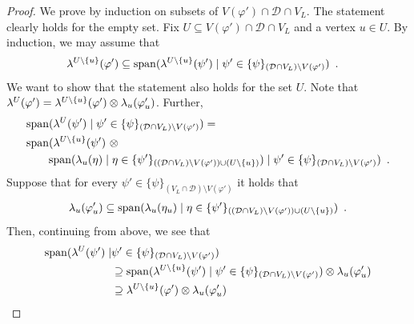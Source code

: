 \documentclass{article}
\newcommand{\set}[1]{\{ #1 \}}
\newcommand{\eqperiod}{\enspace .}
\newcommand{\V}[1][]{V_{#1}}
\newcommand{\Vl}{\V[L]}
\newcommand{\linmap}[1][]{\ensuremath \lambda_{{#1}}}
\newcommand{\linmapof}[2][]{\linmap[#1](#2)}
\newcommand{\linmapl}[2][]{\ensuremath \lambda^{{#2}}_{{#1}}}
\newcommand{\linmaplof}[3][]{\linmapl[#1]{#2}(#3)}
\newcommand{\diffclosure}[1][]{D_{{#1}}}
\renewcommand{\diffclosure}[1][]{\mathcal{D}_{{#1}}}
\newcommand{\matchb}{\varphi'}
\newcommand{\matchc}{\psi}
\newcommand{\matchd}{\psi'}
\newcommand{\matche}{\eta}
\newcommand{\spans}[1]{\mathrm{span} ( #1 )}
\newcommand{\tensor}{\ensuremath \otimes}
\numberwithin{equation}{section}
\begin{document}
\begin{proof}
  We prove  by induction on subsets of
  $V(\matchb) \cap \diffclosure \cap \Vl$. The statement clearly holds
  for the empty set. 
  Fix $U \subseteq V(\matchb) \cap \diffclosure \cap \Vl$ and a vertex
  $u \in U$. By induction, we may assume that
  \begin{align}\label{eq:ih}
    \linmaplof{U \setminus \set{u}}{\matchb}
    &\subseteq
      \spans{
      \linmaplof{U
      \setminus \set{u}}
      {\matchd} \mid \matchd \in 
      \set{\matchc}_{(\diffclosure \cap \Vl) \setminus V(\matchb)}} 
      \eqperiod
  \end{align}
  We want to show that the statement also holds for the set $U$.
  Note that 
    $\linmaplof{U}{\matchb} 
    = 
    \linmaplof{U \setminus \set{u}}{\matchb} \tensor 
    \linmapof[u]{\matchb_u}$. Further,
  \begin{align}
    &\spans{\linmaplof{U}{\matchd}
      \mid \matchd \in \set{\matchc}_{(\diffclosure \cap \Vl)
      \setminus V(\matchb)}
      } =\\
    &\spans{\linmaplof{U \setminus \set{u}}{\matchd} ~\tensor
      \nonumber\\
    &\qquad
    \spans{\linmapof[u]{\matche} \mid \matche \in
      \set{\matchd}_{((\diffclosure \cap \Vl) \setminus
    V(\matchb)) \cup (U \setminus \set{u})}}
      \mid \matchd \in \set{\matchc}_{(\diffclosure \cap \Vl)
      \setminus V(\matchb)}
      } \eqperiod
  \end{align}
  Suppose that for every $\matchd \in \set{\matchc}_{(\Vl \cap \diffclosure)
      \setminus V(\matchb)}$ it holds that
  \begin{align}\label{eq:linspace_u_spanned}
    \linmapof[u]{\matchb_u} \subseteq \spans{\linmapof[u]{\matche_u} 
    \mid \matche \in \set{\matchd}
    _{((\diffclosure \cap \Vl) \setminus V(\matchb))\cup (U \setminus
    \set{u})}}
    \eqperiod
  \end{align}
  Then, continuing from above, we see that
  \begin{align}
    \spans{\linmaplof{U}{\matchd}
      \mid &\matchd \in \set{\matchc}_{(\diffclosure \cap \Vl)
      \setminus V(\matchb)}
      } \\
    &\supseteq
      \spans{\linmaplof{U \setminus \set{u}}{\matchd}
      \mid \matchd \in \set{\matchc}_{(\diffclosure \cap \Vl)
      \setminus V(\matchb)}
      }
      \tensor \linmapof[u]{\matchb_u}\\
    &\supseteq
      \linmaplof{U \setminus \set{u}}{\matchb} \tensor 
      \linmapof[u]{\matchb_u}\\

\end{align}
\end{proof}
\end{document}
